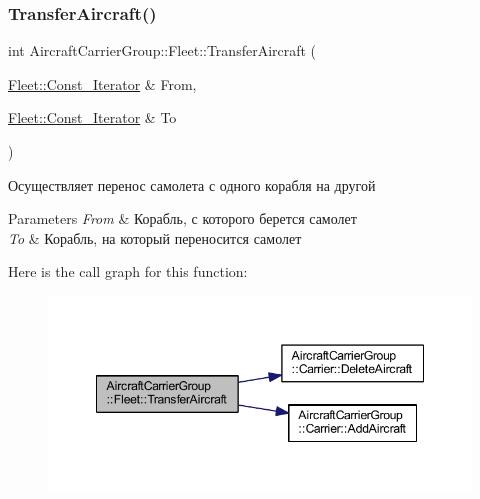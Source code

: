 \subsubsection{\texorpdfstring{Transfer\+Aircraft()}{TransferAircraft()}}
{\footnotesize\ttfamily int Aircraft\+Carrier\+Group\+::\+Fleet\+::\+Transfer\+Aircraft (\begin{DoxyParamCaption}\item[{\mbox{\hyperlink{class_aircraft_carrier_group_1_1_const_fleet_it}{Fleet\+::\+Const\+\_\+\+Iterator}} \&}]{From,  }\item[{\mbox{\hyperlink{class_aircraft_carrier_group_1_1_const_fleet_it}{Fleet\+::\+Const\+\_\+\+Iterator}} \&}]{To }\end{DoxyParamCaption})}



Осуществляет перенос самолета с одного корабля на другой 


\begin{DoxyParams}{Parameters}
{\em From} & Корабль, с которого берется самолет \\
\hline
{\em To} & Корабль, на который переносится самолет \\
\hline
\end{DoxyParams}
Here is the call graph for this function\+:
\nopagebreak
\begin{figure}[H]
\begin{center}
\leavevmode
\includegraphics[width=348pt]{class_aircraft_carrier_group_1_1_fleet_afdc755fad8b201aa497161a5ef63a97c_cgraph}
\end{center}
\end{figure}
\mbox{\label{class_aircraft_carrier_group_1_1_fleet_af9ddb1220e3a01986eaa433e52fa7098}} 
